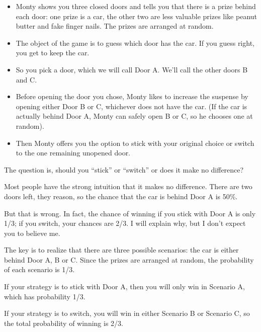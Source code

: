 \documentclass[12pt]{book}
\begin{document}
\begin{itemize}

\item Monty shows you three closed doors and tells you that there is a
  prize behind each door: one prize is a car, the other two are less
  valuable prizes like peanut butter and fake finger nails.  The
  prizes are arranged at random.

\item The object of the game is to guess which door has the car.  If
  you guess right, you get to keep the car.

\item So you pick a door, which we will call Door A.  We'll call the
  other doors B and C.

\item Before opening the door you chose, Monty likes to increase the
  suspense by opening either Door B or C, whichever does not
  have the car.  (If the car is actually behind Door A, Monty can
  safely open B or C, so he chooses one at random).

\item Then Monty offers you the option to stick with your original
  choice or switch to the one remaining unopened door.

\end{itemize}

The question is, should you ``stick'' or ``switch'' or does it
make no difference?

Most people have the strong intuition that it makes no difference.
There are two doors left, they reason, so the chance that the car
is behind Door A is 50\%.

But that is wrong.  In fact, the chance of winning if you stick
with Door A is only 1/3; if you switch, your chances are 2/3.
I will explain why, but I don't expect you to believe me.

The key is to realize that there are three possible scenarios:
the car is either behind Door A, B or C.  Since the prizes are
arranged at random, the probability of each scenario is 1/3.

If your strategy is to stick with Door A, then you will only
win in Scenario A, which has probability 1/3.

If your strategy is to switch, you will win in either Scenario
B or Scenario C, so the total probability of winning is 2/3.

\end{document}
